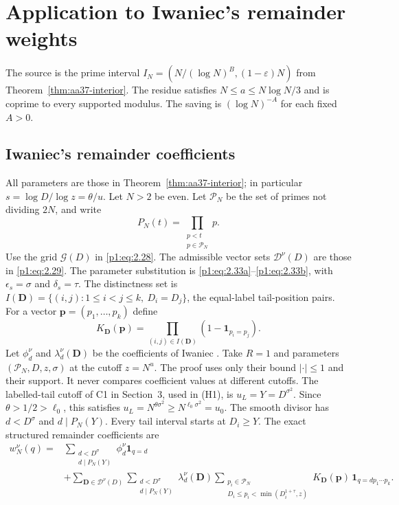 \section{Application to Iwaniec's remainder weights}
\label{sec:linear-sieve-application}

The source is the prime interval
$I_N=(N/(\log N)^B,(1-\varepsilon)N)$ from
Theorem~\ref{thm:aa37-interior}. The residue satisfies
$N\le a\le N\log N/3$ and is coprime to every supported modulus.
The saving is $(\log N)^{-A}$ for each fixed $A>0$.

\subsection{Iwaniec's remainder coefficients}

All parameters are those in Theorem~\ref{thm:aa37-interior}; in
particular $s=\log D/\log z=\theta/u$.
Let $N>2$ be even. Let $\mathcal P_N$ be the set of primes not
dividing $2N$, and write
\[
 P_N(t)=\prod_{\substack{p<t\\p\in\mathcal P_N}}p.
\]
Use the grid $\mathcal G(D)$ in \eqref{p1:eq:2.28}. The admissible
vector sets $\mathcal D^\nu(D)$ are those in \eqref{p1:eq:2.29}.
The parameter substitution is \eqref{p1:eq:2.33a}--\eqref{p1:eq:2.33b},
with $\epsilon_s=\sigma$ and $\delta_s=\tau$. The distinctness set is
$I(\mathbf D)=\{(i,j):1\le i<j\le k,\ D_i=D_j\}$, the equal-label
tail-position pairs. For a vector $\mathbf p=(p_1,\ldots,p_k)$ define
\[
 K_{\mathbf D}(\mathbf p)
   =\prod_{(i,j)\in I(\mathbf D)}
       (1-\mathbf 1_{p_i=p_j}).
\]
Let $\phi_d^\nu$ and $\lambda_d^\nu(\mathbf D)$ be the coefficients of
Iwaniec \cite[Theorem~4]{AA37}. Take $R=1$ and parameters
$(\mathcal P_N,D,z,\sigma)$ at the cutoff $z=N^u$. The proof uses only
their bound $|\cdot|\le1$ and their support. It never compares
coefficient values at different cutoffs.
The labelled-tail cutoff of C1 in Section~3, used in (H1), is
$u_L=Y=D^{\sigma^2}$.
Since $\theta>1/2>\ell_0$, this satisfies
$u_L=N^{\theta\sigma^2}\ge N^{\ell_0\sigma^2}=u_0$.
The smooth divisor has $d<D^\sigma$ and $d\mid P_N(Y)$. Every
tail interval starts at $D_i\ge Y$.
The exact structured remainder coefficients are
\begin{equation*}\tag*{(W)}
\begin{split}
 w_N^\nu(q)
 ={}&\sum_{\substack{d<D^\sigma\\d\mid P_N(Y)}}
          \phi_d^\nu\mathbf1_{q=d}\\
 &+\sum_{\mathbf D\in\mathcal D^\nu(D)}
   \sum_{\substack{d<D^\sigma\\d\mid P_N(Y)}}
       \lambda_d^\nu(\mathbf D)
   \sum_{\substack{p_i\in\mathcal P_N\\
             D_i\leq p_i<\min(D_i^{1+\tau},z)}}
       K_{\mathbf D}(\mathbf p)\,
       \mathbf1_{q=dp_1\cdots p_k}.
\end{split}
\end{equation*}
